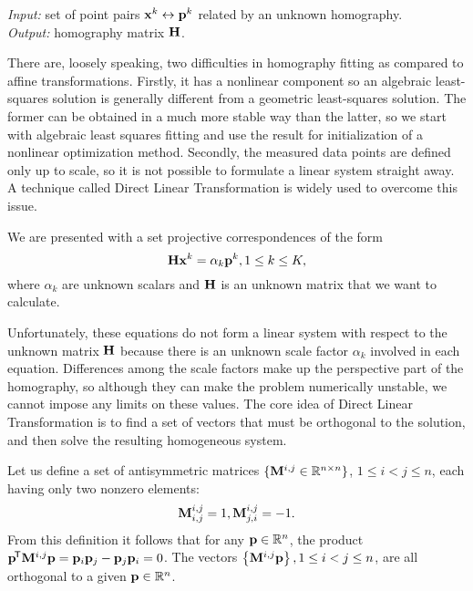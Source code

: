 \textit{Input:} set of point pairs $\mathbf{x}^k \leftrightarrow \mathbf{p}^k$ related by an unknown homography.\\
\textit{Output:} homography matrix $\mathbf{H}$.\\


There are, loosely speaking, two difficulties in homography fitting as compared to affine transformations.
Firstly, it has a nonlinear component so an algebraic least-squares solution is generally different from a geometric least-squares solution.
The former can be obtained in a much more stable way than the latter, so we start with algebraic least squares fitting and use the result for initialization of a nonlinear optimization method.
Secondly, the measured data points are defined only up to scale, so it is not possible to formulate a linear system straight away.
A technique called Direct Linear Transformation is widely used to overcome this issue.

We are presented with a set projective correspondences of the form
$$\mathbf{H} \mathbf{x}^k = \alpha_k \mathbf{p}^k, 1 \leq k \leq K,$$
where $\alpha_k$ are unknown scalars and $\mathbf{H}$ is an unknown matrix that we want to calculate.

Unfortunately, these equations do not form a linear system with respect to the unknown matrix $\mathbf{H}$ because there is an unknown scale factor $\alpha_k$ involved in each equation.
Differences among the scale factors make up the perspective part of the homography, so although they can make the problem numerically unstable, we cannot impose any limits on these values.
The core idea of Direct Linear Transformation is to find a set of vectors that must be orthogonal to the solution, and then solve the resulting homogeneous system.

Let us define a set of antisymmetric matrices $\{\mathbf{M}^{i, j} \in \mathbb{R}^{n \times n}\}$, $1 \leq i < j \leq n$, each having only two nonzero elements:
$$\mathbf{M}^{i, j}_{i, j} = 1,
\mathbf{M}^{i, j}_{j, i} = -1.$$
From this definition it follows that for any $\mathbf{p} \in \mathbb{R}^n$, the product $\mathbf{p}^{\!\mathsf{T}} \mathbf{M}^{i, j} \mathbf{p} = \mathbf{p}_{i} \mathbf{p}_{j} - \mathbf{p}_{j} \mathbf{p}_{i} = 0$.
The vectors $\left\{ \mathbf{M}^{i, j} \mathbf{p} \right\}, 1 \leq i < j \leq n$, are all orthogonal to a given $\mathbf{p} \in \mathbb{R}^n$.

